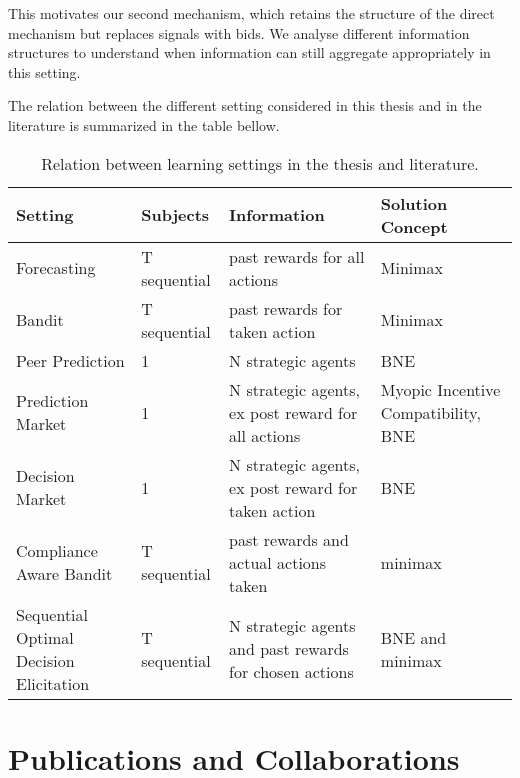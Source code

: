 
This motivates our second mechanism, which retains the structure of the direct mechanism but replaces signals with bids. We analyse different information structures to understand when information can still aggregate appropriately in this setting.

The relation between the different setting considered in this thesis and in the literature is summarized in the table bellow.

\begin{table}
\begin{tabular}{llll}
\toprule
Setting & Subjects & Information & Solution Concept\\
\midrule
Forecasting & T sequential & past rewards for all actions & Minimax  \\
Bandit & T sequential & past rewards for taken action  &  Minimax  \\
Peer Prediction & 1 & N strategic agents & BNE \\
Prediction Market & 1 & N strategic agents, ex post reward for all actions & Myopic Incentive Compatibility, BNE\\
Decision Market & 1 & N strategic agents, ex post reward for taken action & BNE  \\
Compliance Aware Bandit & T sequential & past rewards and actual actions taken & minimax \\
Sequential Optimal Decision Elicitation  & T sequential &  N strategic agents and past rewards for chosen actions & BNE and minimax \\
\bottomrule
\end{tabular} 
\caption{Relation between learning settings in the thesis and literature.}
\end{table}


\section{Publications and Collaborations}

